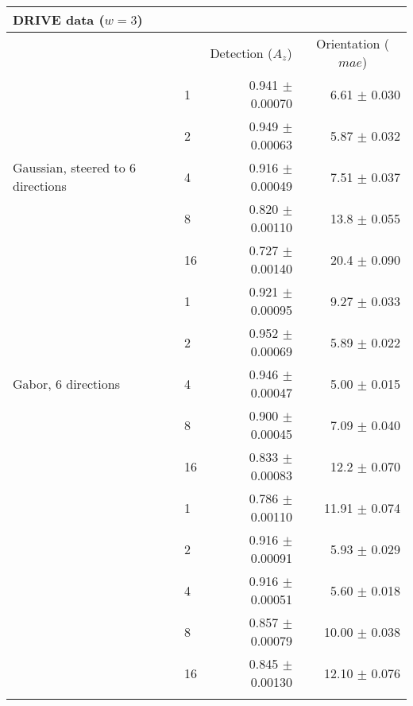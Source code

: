 
\begin{tabularx}{\columnwidth}{X X r r}
\toprule
\multicolumn{4}{p{\columnwidth}}{ DRIVE data ($w = 3$)} \\
\midrule
        &                               & \multicolumn{1}{c}{Detection  \linebreak ($A_z$)}
                                        & \multicolumn{1}{c}{Orientation  \linebreak ($mae$)} \\
\midrule
\multirow{5}{2cm}{Gaussian, steered to 6 directions}
        & 1     & 0.941 $\pm$  0.00070  & 6.61 $\pm$  0.030 \\
        & 2     & 0.949 $\pm$  0.00063  & 5.87 $\pm$  0.032 \\
        & 4     & 0.916 $\pm$  0.00049  & 7.51 $\pm$  0.037 \\
        & 8     & 0.820 $\pm$  0.00110  & 13.8 $\pm$  0.055 \\
        & 16    & 0.727 $\pm$  0.00140  & 20.4 $\pm$  0.090 \\

\midrule
\multirow{5}{2cm}{Gabor, 6 directions}
        & 1     & 0.921 $\pm$  0.00095  & 9.27 $\pm$  0.033 \\
        & 2     & 0.952 $\pm$  0.00069  & 5.89 $\pm$  0.022 \\
        & 4     & 0.946 $\pm$  0.00047  & 5.00 $\pm$  0.015 \\
        & 8     & 0.900 $\pm$  0.00045  & 7.09 $\pm$  0.040 \\
        & 16    & 0.833 $\pm$  0.00083  & 12.2 $\pm$  0.070 \\
\midrule
\multirow{5}{2cm}{\dtcwt{}}
        & 1     & 0.786 $\pm$  0.00110  & 11.91 $\pm$  0.074 \\
        & 2     & 0.916 $\pm$  0.00091  & 5.93 $\pm$  0.029 \\
        & 4     & 0.916 $\pm$  0.00051  & 5.60 $\pm$  0.018\\
        & 8     & 0.857 $\pm$  0.00079  & 10.00 $\pm$  0.038 \\
        & 16    & 0.845 $\pm$  0.00130  & 12.10 $\pm$  0.076 \\

\bottomrule
\noalign{\smallskip}
\end{tabularx}
